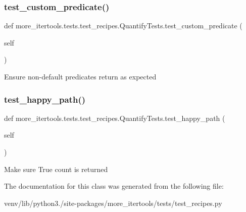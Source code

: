 \subsubsection{\texorpdfstring{test\+\_\+custom\+\_\+predicate()}{test\_custom\_predicate()}}
{\footnotesize\ttfamily def more\+\_\+itertools.\+tests.\+test\+\_\+recipes.\+Quantify\+Tests.\+test\+\_\+custom\+\_\+predicate (\begin{DoxyParamCaption}\item[{}]{self }\end{DoxyParamCaption})}

\begin{DoxyVerb}Ensure non-default predicates return as expected\end{DoxyVerb}
 \mbox{\label{classmore__itertools_1_1tests_1_1test__recipes_1_1_quantify_tests_afe082e94e0e64953c69d05824697b73d}} 
\subsubsection{\texorpdfstring{test\+\_\+happy\+\_\+path()}{test\_happy\_path()}}
{\footnotesize\ttfamily def more\+\_\+itertools.\+tests.\+test\+\_\+recipes.\+Quantify\+Tests.\+test\+\_\+happy\+\_\+path (\begin{DoxyParamCaption}\item[{}]{self }\end{DoxyParamCaption})}

\begin{DoxyVerb}Make sure True count is returned\end{DoxyVerb}
 

The documentation for this class was generated from the following file\+:\begin{DoxyCompactItemize}
\item 
venv/lib/python3./site-\/packages/more\+\_\+itertools/tests/test\+\_\+recipes.\+py\end{DoxyCompactItemize}
